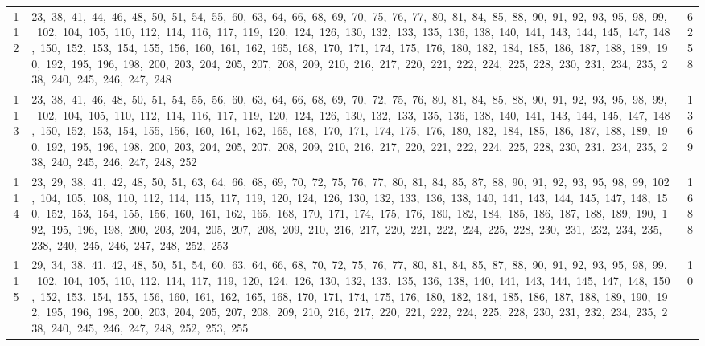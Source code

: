 \begin{longtable}{c|p{}|r}
112 & 23,\ 38,\ 41,\ 44,\ 46,\ 48,\ 50,\ 51,\ 54,\ 55,\ 60,\ 63,\ 64,\ 66,\ 68,\ 69,\ 70,\ 75,\ 76,\ 77,\ 80,\ 81,\ 84,\ 85,\ 88,\ 90,\ 91,\ 92,\ 93,\ 95,\ 98,\ 99,\ 102,\ 104,\ 105,\ 110,\ 112,\ 114,\ 116,\ 117,\ 119,\ 120,\ 124,\ 126,\ 130,\ 132,\ 133,\ 135,\ 136,\ 138,\ 140,\ 141,\ 143,\ 144,\ 145,\ 147,\ 148,\ 150,\ 152,\ 153,\ 154,\ 155,\ 156,\ 160,\ 161,\ 162,\ 165,\ 168,\ 170,\ 171,\ 174,\ 175,\ 176,\ 180,\ 182,\ 184,\ 185,\ 186,\ 187,\ 188,\ 189,\ 190,\ 192,\ 195,\ 196,\ 198,\ 200,\ 203,\ 204,\ 205,\ 207,\ 208,\ 209,\ 210,\ 216,\ 217,\ 220,\ 221,\ 222,\ 224,\ 225,\ 228,\ 230,\ 231,\ 234,\ 235,\ 238,\ 240,\ 245,\ 246,\ 247,\ 248 & 6258 \\
113 & 23,\ 38,\ 41,\ 46,\ 48,\ 50,\ 51,\ 54,\ 55,\ 56,\ 60,\ 63,\ 64,\ 66,\ 68,\ 69,\ 70,\ 72,\ 75,\ 76,\ 80,\ 81,\ 84,\ 85,\ 88,\ 90,\ 91,\ 92,\ 93,\ 95,\ 98,\ 99,\ 102,\ 104,\ 105,\ 110,\ 112,\ 114,\ 116,\ 117,\ 119,\ 120,\ 124,\ 126,\ 130,\ 132,\ 133,\ 135,\ 136,\ 138,\ 140,\ 141,\ 143,\ 144,\ 145,\ 147,\ 148,\ 150,\ 152,\ 153,\ 154,\ 155,\ 156,\ 160,\ 161,\ 162,\ 165,\ 168,\ 170,\ 171,\ 174,\ 175,\ 176,\ 180,\ 182,\ 184,\ 185,\ 186,\ 187,\ 188,\ 189,\ 190,\ 192,\ 195,\ 196,\ 198,\ 200,\ 203,\ 204,\ 205,\ 207,\ 208,\ 209,\ 210,\ 216,\ 217,\ 220,\ 221,\ 222,\ 224,\ 225,\ 228,\ 230,\ 231,\ 234,\ 235,\ 238,\ 240,\ 245,\ 246,\ 247,\ 248,\ 252 & 1369 \\
114 & 23,\ 29,\ 38,\ 41,\ 42,\ 48,\ 50,\ 51,\ 63,\ 64,\ 66,\ 68,\ 69,\ 70,\ 72,\ 75,\ 76,\ 77,\ 80,\ 81,\ 84,\ 85,\ 87,\ 88,\ 90,\ 91,\ 92,\ 93,\ 95,\ 98,\ 99,\ 102,\ 104,\ 105,\ 108,\ 110,\ 112,\ 114,\ 115,\ 117,\ 119,\ 120,\ 124,\ 126,\ 130,\ 132,\ 133,\ 136,\ 138,\ 140,\ 141,\ 143,\ 144,\ 145,\ 147,\ 148,\ 150,\ 152,\ 153,\ 154,\ 155,\ 156,\ 160,\ 161,\ 162,\ 165,\ 168,\ 170,\ 171,\ 174,\ 175,\ 176,\ 180,\ 182,\ 184,\ 185,\ 186,\ 187,\ 188,\ 189,\ 190,\ 192,\ 195,\ 196,\ 198,\ 200,\ 203,\ 204,\ 205,\ 207,\ 208,\ 209,\ 210,\ 216,\ 217,\ 220,\ 221,\ 222,\ 224,\ 225,\ 228,\ 230,\ 231,\ 232,\ 234,\ 235,\ 238,\ 240,\ 245,\ 246,\ 247,\ 248,\ 252,\ 253 & 1688 \\
115 & 29,\ 34,\ 38,\ 41,\ 42,\ 48,\ 50,\ 51,\ 54,\ 60,\ 63,\ 64,\ 66,\ 68,\ 70,\ 72,\ 75,\ 76,\ 77,\ 80,\ 81,\ 84,\ 85,\ 87,\ 88,\ 90,\ 91,\ 92,\ 93,\ 95,\ 98,\ 99,\ 102,\ 104,\ 105,\ 110,\ 112,\ 114,\ 117,\ 119,\ 120,\ 124,\ 126,\ 130,\ 132,\ 133,\ 135,\ 136,\ 138,\ 140,\ 141,\ 143,\ 144,\ 145,\ 147,\ 148,\ 150,\ 152,\ 153,\ 154,\ 155,\ 156,\ 160,\ 161,\ 162,\ 165,\ 168,\ 170,\ 171,\ 174,\ 175,\ 176,\ 180,\ 182,\ 184,\ 185,\ 186,\ 187,\ 188,\ 189,\ 190,\ 192,\ 195,\ 196,\ 198,\ 200,\ 203,\ 204,\ 205,\ 207,\ 208,\ 209,\ 210,\ 216,\ 217,\ 220,\ 221,\ 222,\ 224,\ 225,\ 228,\ 230,\ 231,\ 232,\ 234,\ 235,\ 238,\ 240,\ 245,\ 246,\ 247,\ 248,\ 252,\ 253,\ 255 & 10 \\

\end{longtable}
